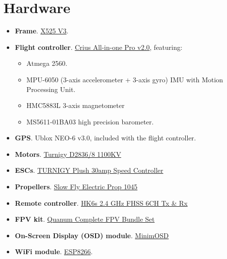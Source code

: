 \section{Hardware}
\begin{itemize}
\item \textbf{Frame}. \href{http://www.ebay.com/itm/4-axis-X525-V3-QuadCopter-Folding-Frame-Friber-Glass-MultiCoptor-DIY-/331416869134?hash=item4d29fc190e}{X525 V3}.
\item \textbf{Flight controller}. \href{http://www.ebay.com/itm/Crius-ALL-IN-ONE-PRO-Flight-Controller-AIOP-V2-0-AIOPIO-Board-NEO-6-V3-0-GPS-e-/261695484553?pt=LH_DefaultDomain_0&hash=item3cee443289}{Crius All-in-one Pro v2.0}, featuring:
\begin{itemize}
\item Atmega 2560.
\item MPU-6050 (3-axis accelerometer + 3-axis gyro) IMU with Motion Processing Unit.
\item HMC5883L 3-axis magnetometer
\item MS5611-01BA03 high precision barometer.
\end{itemize}
\item \textbf{GPS}. Ublox NEO-6 v3.0, included with the flight controller. 
\item \textbf{Motors}. \href{https://www.hobbyking.com/hobbyking/store/uh_viewItem.asp?idProduct=18969}{Turnigy D2836/8 1100KV}
\item \textbf{ESCs}.   \href{https://www.hobbyking.com/hobbyking/store/uh_viewItem.asp?idProduct=2164}{TURNIGY Plush 30amp Speed Controller}
\item \textbf{Propellers}. \href{https://www.hobbyking.com/hobbyking/store/uh_viewItem.asp?idProduct=22448}{Slow Fly Electric Prop 1045}
\item \textbf{Remote controller}. \href{HobbyKing HK6S 2.4Ghz FHSS 6Ch Tx & Rx (Mode 1)
}{HK6s 2.4 GHz FHSS 6CH Tx \& Rx}
\item \textbf{FPV kit}. \href{https://www.hobbyking.com/hobbyking/store/uh_viewItem.asp?idProduct=63646}{Quanum Complete FPV Bundle Set}
\item \textbf{On-Screen Display (OSD) module}. \href{http://www.ebay.com/itm/On-Screen-Display-CRIUS-MAVLink-OSD-V2-Board-MinimOSD-APM-Telemetry-to-APM-1-2-i-/361187166052?pt=LH_DefaultDomain_0&hash=item54186ec764}{MinimOSD}
\item \textbf{WiFi module}. \href{http://www.ebay.com/itm/High-Quality-ESP8266-serial-WIFI-Wireless-Transceiver-Module-Receive-AP-STA-/171733161792?pt=LH_DefaultDomain_0&hash=item27fc181740}{ESP8266}. 

\end{itemize}
